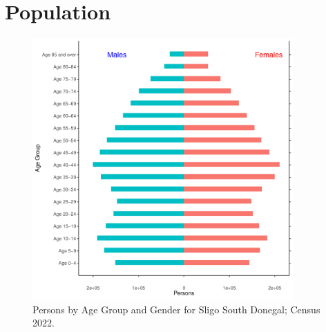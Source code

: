 \documentclass{article}
\begin{document}
\pagebreak

\section{Population} 
\label{sect:Pop}

\begin{figure}[h]
	\centering
	\includegraphics[width = 100mm]{../figures/PyramidPlot.pdf}
	\caption{Persons by Age Group and Gender for Sligo South Donegal; Census 2022.}
	\label{fig:2ae19629-1a6a-13a3-e055-000000000001}
	\end{figure}
\end{document}

